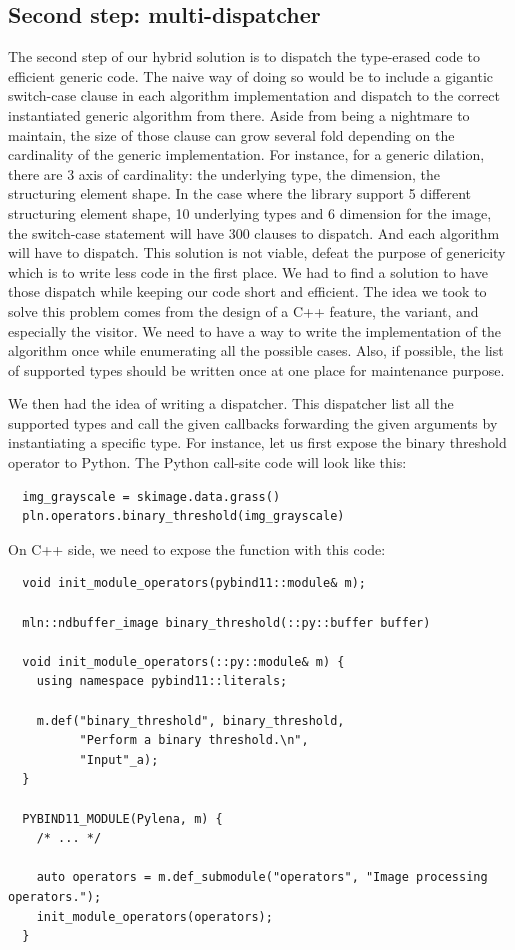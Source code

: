 \subsection{Second step: multi-dispatcher}
The second step of our hybrid solution is to dispatch the type-erased code to efficient generic code. The naive way of
doing so would be to include a gigantic switch-case clause in each algorithm implementation and dispatch to the correct
instantiated generic algorithm from there. Aside from being a nightmare to maintain, the size of those clause can grow
several fold depending on the cardinality of the generic implementation. For instance, for a generic dilation, there are
3 axis of cardinality: the underlying type, the dimension, the structuring element shape. In the case where the library
support 5 different structuring element shape, 10 underlying types and 6 dimension for the image, the switch-case
statement will have 300 clauses to dispatch. And each algorithm will have to dispatch. This solution is not viable,
defeat the purpose of genericity which is to write less code in the first place. We had to find a solution to have those
dispatch while keeping our code short and efficient. The idea we took to solve this problem comes from the design of a
C++ feature, the variant, and especially the visitor. We need to have a way to write the implementation of the algorithm
once while enumerating all the possible cases. Also, if possible, the list of supported types should be written once at
one place for maintenance purpose.

We then had the idea of writing a dispatcher. This dispatcher list all the supported types and call the given callbacks
forwarding the given arguments by instantiating a specific type. For instance, let us first expose the binary threshold
operator to Python. The Python call-site code will look like this:

\begin{verbatim}
  img_grayscale = skimage.data.grass()
  pln.operators.binary_threshold(img_grayscale)
\end{verbatim}

On C++ side, we need to expose the function with this code:
\begin{verbatim}
  void init_module_operators(pybind11::module& m);

  mln::ndbuffer_image binary_threshold(::py::buffer buffer)

  void init_module_operators(::py::module& m) {
    using namespace pybind11::literals;

    m.def("binary_threshold", binary_threshold,
          "Perform a binary threshold.\n",
          "Input"_a);
  }

  PYBIND11_MODULE(Pylena, m) {
    /* ... */

    auto operators = m.def_submodule("operators", "Image processing operators.");
    init_module_operators(operators);
  }
\end{verbatim}

